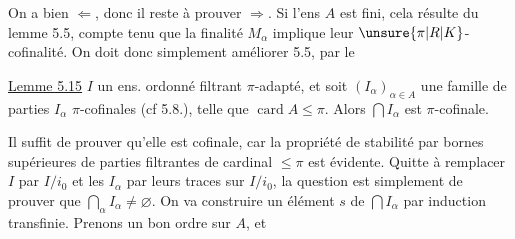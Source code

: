  On a bien  $\Longleftarrow$, donc il reste à prouver $\Longrightarrow$. Si l'ens  $A$ est fini, cela résulte du lemme 5.5, compte tenu que la finalité  $M_\alpha$ implique leur $\unsure{\pi|R|K}$-cofinalité. On doit donc simplement améliorer 5.5, par le

\uline{Lemme 5.15}   $I$ un ens. ordonné filtrant $\pi$-adapté, et soit $(I_\alpha)_{\alpha\in A}$ une famille de parties $I_\alpha$ $\pi$-cofinales (cf 5.8.), telle que $\operatorname{card} A\leq\pi$. Alors $\bigcap I_\alpha$ est $\pi$-cofinale.

Il suffit de prouver qu'elle est cofinale, car la propriété de stabilité par bornes supérieures de parties filtrantes de cardinal $\leq\pi$ est évidente. Quitte à remplacer $I$ par $I/i_0$ et les $I_\alpha$ par leurs traces sur $I/i_0$, la question est simplement de prouver que $\bigcap_\alpha I_\alpha\ne\varnothing$. On va construire un élément $s$ de $\bigcap I_\alpha$ par induction transfinie. Prenons un bon ordre sur $A$, et   
